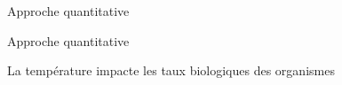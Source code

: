 \documentclass[11pt, compress, aspectratio=1610]{beamer}
\begin{document}
\begin{frame}{Approche quantitative}

\centering
\par

\end{frame}

\begin{frame}{Approche quantitative}

\centering
\par

\end{frame}

\begin{frame}{La température impacte les taux biologiques des
organismes}

\centering


\end{frame}
\end{document}

